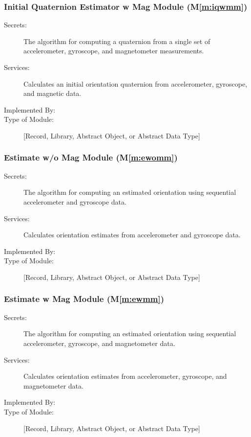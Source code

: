 \documentclass[12pt, titlepage]{article}
\newcommand{\mref}[1]{M\ref{#1}}
\begin{document}
\subsubsection{Initial Quaternion Estimator w Mag Module (\mref{m:iqwmm})}

\begin{description}
\item[Secrets:] The algorithm for computing a quaternion from a single set of accelerometer, gyroscope, and magnetometer measurements.
\item[Services:] Calculates an initial orientation quaternion from accelerometer, gyroscope, and magnetic data.
\item[Implemented By:] \progname
\item[Type of Module:] [Record, Library, Abstract Object, or Abstract Data Type]
\end{description}

\subsubsection{Estimate w/o Mag Module (\mref{m:ewomm})}

\begin{description}
\item[Secrets:] The algorithm for computing an estimated orientation using sequential accelerometer and gyroscope data.
\item[Services:] Calculates orientation estimates from accelerometer and gyroscope data.
\item[Implemented By:] \progname
\item[Type of Module:] [Record, Library, Abstract Object, or Abstract Data Type]
\end{description}

\subsubsection{Estimate w Mag Module (\mref{m:ewmm})}

\begin{description}
\item[Secrets:] The algorithm for computing an estimated orientation using sequential accelerometer, gyroscope, and magnetometer data.
\item[Services:] Calculates orientation estimates from accelerometer, gyroscope, and magnetometer data.
\item[Implemented By:] \progname
\item[Type of Module:] [Record, Library, Abstract Object, or Abstract Data Type]
\end{description}
\end{document}
